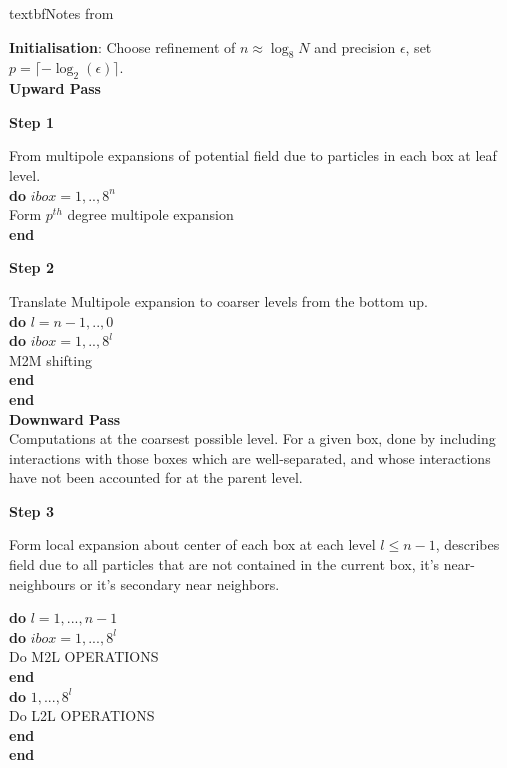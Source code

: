textbf{Notes from \cite{Greengard:1987:Yale}}

\textbf{Initialisation}: Choose refinement of $n \approx \log_8 N$ and precision
$\epsilon$, set $p= \lceil -\log_2(\epsilon) \rceil$. \\

\textbf{Upward Pass}
\begin{center}
    \textbf{Step 1}
\end{center}
From multipole expansions of potential field due to particles in each box at
leaf level. \\

\noindent \textbf{do} $\textit{ibox}=1,..,8^n$ \\
\indent   Form $p^{th}$ degree multipole expansion \\
\noindent \textbf{end}

\begin{center}
    \textbf{Step 2}
\end{center}
Translate Multipole expansion to coarser levels from the bottom up.\\

\noindent \textbf{do} $l=n-1,..,0$ \\
\indent \textbf{do} $\textit{ibox}=1,..,8^l$ \\
\indent \indent M2M shifting \\
\indent \textbf{end} \\
\noindent \textbf{end} \\

\textbf{Downward Pass} \\

Computations at the coarsest possible level. For a given box, done by including
interactions with those boxes which are \gls{well-separated}, and whose interactions
have not been accounted for at the parent level.

\begin{center}
    \textbf{Step 3}
\end{center}
Form local expansion about center of each box at each level $l \leq n-1$, describes
field due to all particles that are not contained in the current box, it's \gls{near-neighbours}
or it's secondary near neighbors.

\noindent \textbf{do} $l=1,...,n-1$ \\
\indent \textbf{do} $\textit{ibox}=1,...,8^l$ \\
\indent \indent Do M2L OPERATIONS \\
\indent \textbf{end} \\
\indent \textbf{do} $1,...,8^l$ \\
\indent \indent Do L2L OPERATIONS \\
\indent \textbf{end} \\
\noindent \textbf{end}\\

